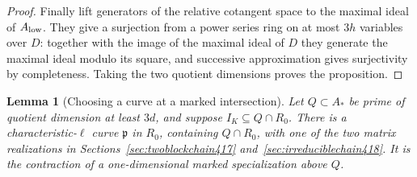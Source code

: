 \documentclass[a4paper,11pt]{article}
\newtheorem{lemma}[proposition]{Lemma}
\theoremstyle{definition}
\theoremstyle{remark}
\numberwithin{equation}{section}
\begin{document}
\begin{proof}
Finally lift generators of the relative cotangent space to
the maximal ideal of \(A_{\rm low}\). They give a surjection
from a power series ring on at most \(3h\) variables over \(D\):
together with the image of the maximal ideal of \(D\) they
generate the maximal ideal modulo its square, and successive
approximation gives surjectivity by completeness. Taking the
two quotient dimensions proves the proposition.
\end{proof}

\begin{lemma}[Choosing a curve at a marked intersection]\leavevmode
\label{lem:markedcurves421}
Let \(Q\subset A_*\) be prime of quotient dimension at least
\(3d\), and suppose \(I_K\subseteq Q\cap R_0\).
There is a characteristic-\(\ell\) curve \(\mathfrak p\) in
\(R_0\), containing \(Q\cap R_0\), with one of the two matrix
realizations in Sections~\ref{sec:twoblockchain417}
and~\ref{sec:irreduciblechain418}. It is the contraction of a
one-dimensional marked specialization above \(Q\).
\end{lemma}
\end{document}
